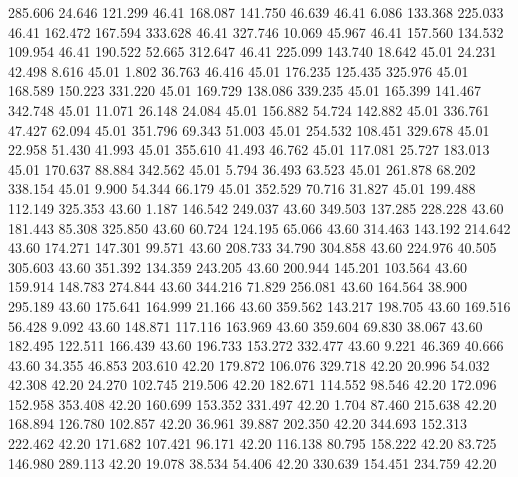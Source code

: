  285.606   24.646  121.299        46.41
 168.087  141.750   46.639        46.41
   6.086  133.368  225.033        46.41
 162.472  167.594  333.628        46.41
 327.746   10.069   45.967        46.41
 157.560  134.532  109.954        46.41
 190.522   52.665  312.647        46.41
 225.099  143.740   18.642        45.01
  24.231   42.498    8.616        45.01
   1.802   36.763   46.416        45.01
 176.235  125.435  325.976        45.01
 168.589  150.223  331.220        45.01
 169.729  138.086  339.235        45.01
 165.399  141.467  342.748        45.01
  11.071   26.148   24.084        45.01
 156.882   54.724  142.882        45.01
 336.761   47.427   62.094        45.01
 351.796   69.343   51.003        45.01
 254.532  108.451  329.678        45.01
  22.958   51.430   41.993        45.01
 355.610   41.493   46.762        45.01
 117.081   25.727  183.013        45.01
 170.637   88.884  342.562        45.01
   5.794   36.493   63.523        45.01
 261.878   68.202  338.154        45.01
   9.900   54.344   66.179        45.01
 352.529   70.716   31.827        45.01
 199.488  112.149  325.353        43.60
   1.187  146.542  249.037        43.60
 349.503  137.285  228.228        43.60
 181.443   85.308  325.850        43.60
  60.724  124.195   65.066        43.60
 314.463  143.192  214.642        43.60
 174.271  147.301   99.571        43.60
 208.733   34.790  304.858        43.60
 224.976   40.505  305.603        43.60
 351.392  134.359  243.205        43.60
 200.944  145.201  103.564        43.60
 159.914  148.783  274.844        43.60
 344.216   71.829  256.081        43.60
 164.564   38.900  295.189        43.60
 175.641  164.999   21.166        43.60
 359.562  143.217  198.705        43.60
 169.516   56.428    9.092        43.60
 148.871  117.116  163.969        43.60
 359.604   69.830   38.067        43.60
 182.495  122.511  166.439        43.60
 196.733  153.272  332.477        43.60
   9.221   46.369   40.666        43.60
  34.355   46.853  203.610        42.20
 179.872  106.076  329.718        42.20
  20.996   54.032   42.308        42.20
  24.270  102.745  219.506        42.20
 182.671  114.552   98.546        42.20
 172.096  152.958  353.408        42.20
 160.699  153.352  331.497        42.20
   1.704   87.460  215.638        42.20
 168.894  126.780  102.857        42.20
  36.961   39.887  202.350        42.20
 344.693  152.313  222.462        42.20
 171.682  107.421   96.171        42.20
 116.138   80.795  158.222        42.20
  83.725  146.980  289.113        42.20
  19.078   38.534   54.406        42.20
 330.639  154.451  234.759        42.20
